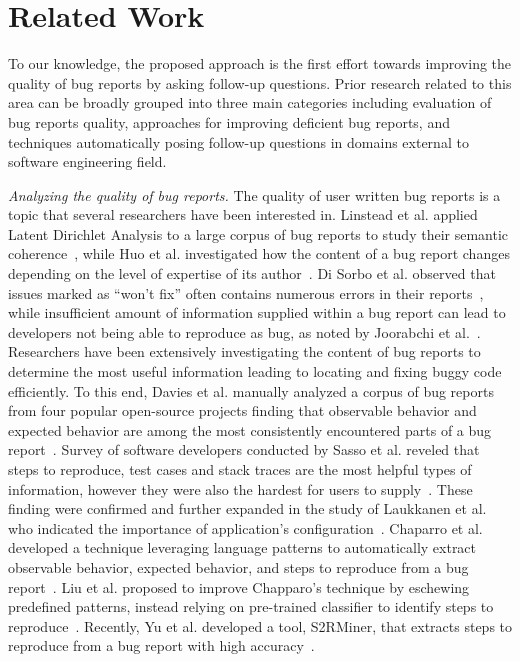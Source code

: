 \section{Related Work}
To our knowledge, the proposed approach is the first effort towards improving the quality of bug reports by asking follow-up questions. Prior research related to this area can be broadly grouped into three main categories including evaluation of bug reports quality, approaches for improving deficient bug reports, and techniques automatically posing follow-up questions in domains external to software engineering field.

\noindent
{\em Analyzing the quality of bug reports.} The quality of user written bug reports is a topic that several researchers have been interested in. Linstead et al. applied Latent Dirichlet Analysis to a large corpus of bug reports to study their semantic coherence~\cite{linstead09mining}, while Huo et al. investigated how the  content of a bug report changes depending on the level of expertise of its author~\cite{Huo2014AnES}. Di Sorbo et al. observed that issues marked as ``won't fix'' often contains numerous errors in their reports~\cite{Sorbo2019WontWF}, while insufficient amount of information supplied within a bug report can lead to developers not being able to reproduce as bug, as noted by Joorabchi et al.~\cite{erfani2014works}.
Researchers have been extensively investigating the content of bug reports to determine the most useful information leading to locating and fixing buggy code efficiently.
To this end, Davies et al. manually analyzed a corpus of bug reports from four popular open-source projects finding that observable behavior and expected behavior are among the most consistently encountered parts of a bug report~\cite{davies14whats}. Survey of software developers conducted by Sasso et al. reveled that steps to reproduce, test cases and stack traces are the most helpful types of information, however they were also the hardest for users to supply~\cite{sasso2016satisficing}. These finding were confirmed and further expanded in the study of Laukkanen et al. who indicated the importance of application's configuration~\cite{laukkanen2011survey}. Chaparro et al. developed a technique leveraging language patterns to automatically extract observable behavior, expected behavior, and steps to reproduce from a bug report~\cite{chaparro17detecting}. Liu et al. proposed to improve Chapparo's technique by eschewing predefined patterns, instead relying on pre-trained classifier to identify steps to reproduce~\cite{liu2020automated}. Recently, Yu et al. developed a tool, S2RMiner, that extracts steps to reproduce from a bug report with high accuracy~\cite{yu2019s2rminer}.
